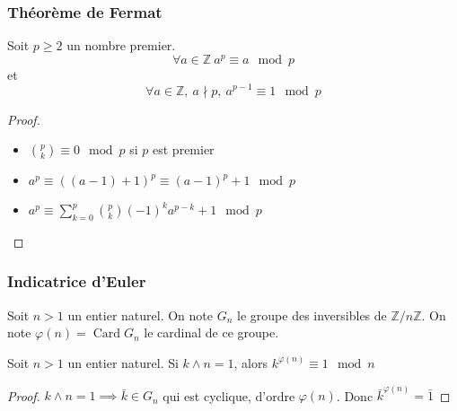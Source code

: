 \documentclass[french]{beamer}
\newcommand{\Z}{\mathbb{Z}}
\begin{document}
\begin{frame}
  \frametitle{Théorème de Fermat}
  \begin{theorem}[Fermat]
    Soit $p\geq 2$ un nombre premier. \[ \forall a\in\Z\ a^p \equiv a
    \mod p \] et \[ \forall a\in\Z,\ a \nmid p,\ a^{p-1} \equiv 1 \mod
    p \]
  \end{theorem}
  \begin{proof}
    \begin{itemize}
      \item $\displaystyle\binom{p}{k} \equiv 0 \mod p$ si $p$ est
        premier
      \item $a^p \equiv ((a-1) + 1)^p \equiv (a-1)^p +1 \mod p$
      \item $a^p \equiv
        \displaystyle\sum_{k=0}^p\binom{p}{k}(-1)^ka^{p-k} + 1 \mod p$
    \end{itemize}
  \end{proof}

\end{frame}

\begin{frame}
  \frametitle{Indicatrice d'Euler}
  \begin{definition}
    Soit $n>1$ un entier naturel. On note $G_n$ le groupe des
    inversibles de $\Z/n\Z$. On note $\varphi(n) = \mathop{Card} G_n$ le
    cardinal de ce groupe.
  \end{definition}

  \begin{theorem}[Euler]
    Soit $n > 1$ un entier naturel. Si $k\wedge n = 1$, alors
    $k^{\varphi(n)} \equiv 1 \mod n$
  \end{theorem}
  \begin{proof}
    $k\wedge n = 1 \implies \bar{k}\in G_n$ qui est cyclique, d'ordre
    $\varphi(n)$. Donc $\bar{k}^{\varphi(n)} = \bar{1}$
  \end{proof}
\end{frame}
\end{document}
